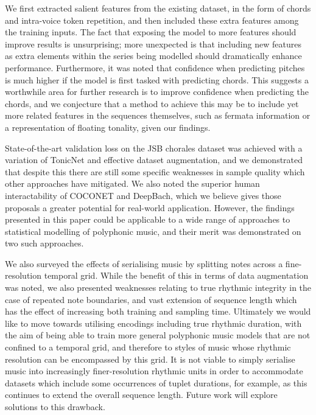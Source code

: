\documentclass{article}
\begin{document}
We first extracted salient features from the existing dataset, in the form of chords and intra-voice token repetition, and then included these extra features among the training inputs. The fact that exposing the model to more features should improve results is unsurprising; more unexpected is that including new features as extra elements within the series being modelled should dramatically enhance performance. Furthermore, it was noted that confidence when predicting pitches is much higher if the model is first tasked with predicting chords. This suggests a worthwhile area for further research is to improve confidence when predicting the chords, and we conjecture that a method to achieve this may be to include yet more related features in the sequences themselves, such as fermata information or a representation of floating tonality, given our findings.

State-of-the-art validation loss on the JSB chorales dataset was achieved with a variation of TonicNet and effective dataset augmentation, and we demonstrated that despite this there are still some specific weaknesses in sample quality which other approaches have mitigated. We also noted the superior human interactability of COCONET and DeepBach, which we believe gives those proposals a greater potential for real-world application. However, the findings presented in this paper could be applicable to a wide range of approaches to statistical modelling of polyphonic music, and their merit was demonstrated on two such approaches.

We also surveyed the effects of serialising music by splitting notes across a fine-resolution temporal grid. While the benefit of this in terms of data augmentation was noted, we also presented weaknesses relating to true rhythmic integrity in the case of repeated note boundaries, and vast extension of sequence length which has the effect of increasing both training and sampling time. Ultimately we would like to move towards utilising encodings including true rhythmic duration, with the aim of being able to train more general polyphonic music models that are not confined to a temporal grid, and therefore to styles of music whose rhythmic resolution can be encompassed by this grid. It is not viable to simply serialise music into increasingly finer-resolution rhythmic units in order to accommodate datasets which include some occurrences of tuplet durations, for example, as this continues to extend the overall sequence length. Future work will explore solutions to this drawback.
\end{document}
